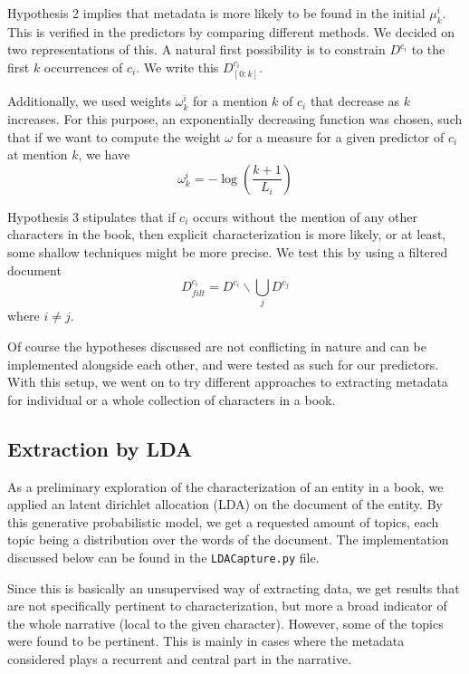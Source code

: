 \vspace*{1em}
Hypothesis 2 implies that metadata is more likely to be found in the initial $\mu^i_k$. This is verified in the predictors by comparing different methods. We decided on two representations of this. A natural first possibility is to constrain $D^{c_i}$ to the first $k$ occurrences of $c_i$. We write this $D^{c_i}_{[0:k]}$. 

Additionally, we used weights $\omega^i_k$ for a mention $k$ of $c_i$ that decrease as $k$ increases. For this purpose, an exponentially decreasing function was chosen, such that if we want to compute the weight $\omega$ for a measure for a given predictor of $c_i$ at mention $k$, we have
\begin{equation}
\omega^i_k = -\log (\frac{k+1}{L_i})
\end{equation}


Hypothesis 3 stipulates that if $c_i$ occurs without the mention of any other characters in the book, then explicit characterization is more likely, or at least, some shallow techniques might be more precise. We test this by using a filtered document 
\begin{equation}
D^{c_i}_{filt} = D^{c_i} \backslash \bigcup_j D^{c_j}
\end{equation}
where $i \neq j$. 

Of course the hypotheses discussed are not conflicting in nature and can be implemented alongside each other, and were tested as such for our predictors. With this setup, we went on to try different approaches to extracting metadata for individual or a whole collection of characters in a book.

\subsection{Extraction by LDA}
As a preliminary exploration of the characterization of an entity in a book, we applied an latent dirichlet allocation (LDA) \cite{blei2003latent} on the document of the entity. By this generative probabilistic model, we get a requested amount of topics, each topic being a distribution over the words of the document. The implementation discussed below can be found in the \texttt{LDACapture.py} file.

Since this is basically an unsupervised way of extracting data, we get results that are not specifically pertinent to characterization, but more a broad indicator of the whole narrative (local to the given character). However, some of the topics were found to be pertinent. This is mainly in cases where the metadata considered plays a recurrent and central part in the narrative.

